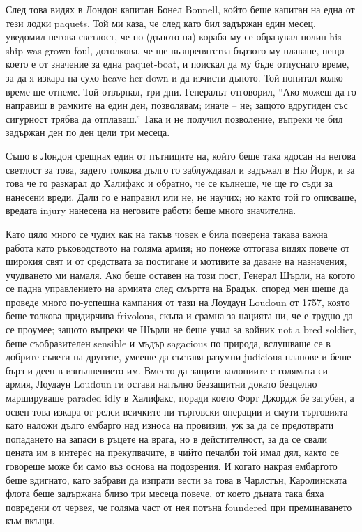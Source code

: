 \documentclass[12pt]{book}
\begin{document}
След това видях в Лондон капитан Бонел Bonnell, който беше капитан на една от тези лодки paquets. Той ми каза, че след като бил задържан един месец, уведомил негова светлост, че по (дъното на) кораба му се образувал полип his ship was grown foul, дотолкова, че ще възпрепятства бързото му плаване, нещо което е от значение за една paquet-boat, и поискал да му бъде отпуснато време, за да я изкара на сухо heave her down и да изчисти дъното. Той попитал колко време ще отнеме. Той отвърнал, три дни. Генералът отговорил, “Ако можеш да го направиш в рамките на един ден, позволявам; иначе – не; защото вдругиден със сигурност трябва да отплаваш.” Така и не получил позволение, въпреки че бил задържан ден по ден цели три месеца. 

Също в Лондон срещнах един от пътниците на, който беше така ядосан на негова светлост за това, задето толкова дълго го заблуждавал и задъжал в Ню Йорк, и за това че го разкарал до Халифакс и обратно, че се кълнеше, че ще го съди за нанесени вреди. Дали го е направил или не, не научих; но както той го описваше, вредата injury нанесена на неговите работи беше много значителна.

Като цяло много се чудих как на такъв човек е била поверена такава важна работа като ръководството на голяма армия; но понеже оттогава видях повече от широкия свят и от средствата за постигане и мотивите за даване на назначения, учудването ми намаля. Ако беше оставен на този пост, Генерал Шърли, на когото се падна управлението на армията след смъртта на Брадък, според мен щеше да проведе много по-успешна кампания от тази на Лоудаун Loudoun от 1757, която беше толкова придирчива frivolous, скъпа и срамна за нацията ни, че е трудно да се проумее; защото въпреки че Шърли не беше учил за войник not a bred soldier, беше съобразителен sensible и мъдър sagacious по природа, вслушваше се в добрите съвети на другите, умееше да съставя разумни judicious планове и беше бърз и деен в изпълнението им. Вместо да защити колониите с голямата си армия, Лоудаун Loudoun ги остави напълно беззащитни докато безцелно маршируваше paraded idly в Халифакс, поради което Форт Джордж бе загубен, а освен това изкара от релси всичките ни търговски операции и смути търговията като наложи дълго ембарго над износа на провизии, уж за да се предотврати попадането на запаси в ръцете на врага, но в дейстителност, за да се свали цената им в интерес на прекупвачите, в чийто печалби той имал дял, както се говореше може би само въз основа на подозрения. И когато накрая ембаргото беше вдигнато, като забрави да изпрати вести за това в Чарлстън, Каролинската флота беше задържана близо три месеца повече, от което дъната така бяха повредени от червея, че голяма част от нея потъна foundered при преминаването към вкъщи. 
\end{document}
